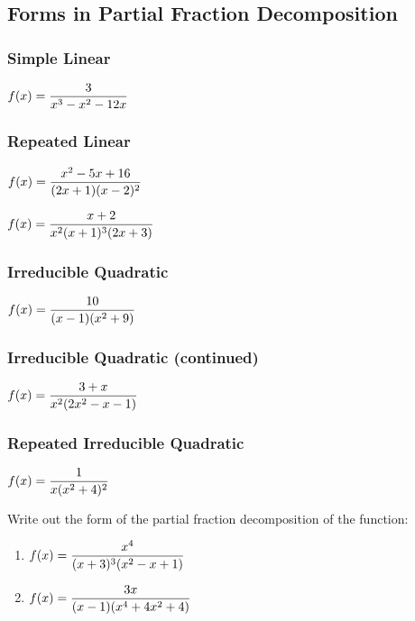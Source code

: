 \documentclass[12pt]{article}
\begin{document}
\newpage

\subsection*{Forms in Partial Fraction Decomposition}

\subsubsection*{ Simple Linear}
\Example $f(x)=\displaystyle\frac{3}{x^3-x^2-12x}$

\vfill

\subsubsection*{ Repeated Linear}
\Example $f(x)=\displaystyle\frac{x^2-5x+16}{(2x+1)(x-2)^2}$

\vfill

\Example $f(x)=\displaystyle\frac{x+2}{x^2(x+1)^3(2x+3)}$

\vfill

\subsubsection*{ Irreducible Quadratic}
\Example $f(x)=\displaystyle\frac{10}{(x-1)(x^2+9)}$

\vfill

\newpage

\subsubsection*{ Irreducible Quadratic (continued)}

\Example $f(x)=\displaystyle\frac{3+x}{x^2(2x^2-x-1)}$

\vfill

\subsubsection*{ Repeated Irreducible Quadratic}
\Example $f(x)=\displaystyle\frac{1}{x(x^2+4)^2}$

\vfill

\Example Write out the form of the partial fraction decomposition of the function:
\begin{enumerate}
\item $f(x)=\displaystyle\frac{x^4}{(x+3)^3(x^2-x+1)}$

\vspace{20mm}

\item $f(x)=\displaystyle\frac{3x}{(x-1)(x^4+4x^2+4)}$

\vspace{20mm}

\end{enumerate}
\end{document}
